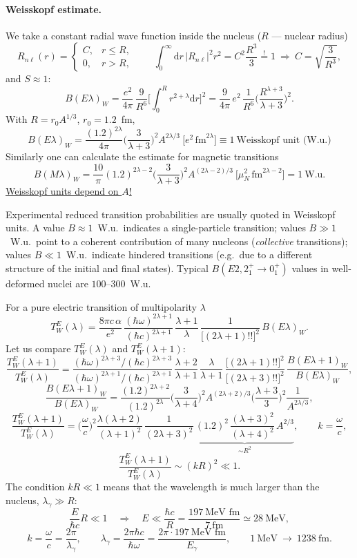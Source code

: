 \documentclass[11pt,a4paper]{article}
\newcommand{\ud}{\mathrm{d}}
\begin{document}
\paragraph{Weisskopf estimate.} We take a constant radial wave function inside the nucleus ($R$ --- nuclear radius)
\[
R_{n\ell}(r)=\begin{cases}C, & r\le R,\\ 0, & r>R,\end{cases}
\qquad
\int_0^\infty\ud r\,|R_{n\ell}|^2r^2=C^2\frac{R^3}{3}\overset{!}{=}1\ \Rightarrow\ C=\sqrt{\frac{3}{R^3}},
\]
and $S\approx1$:
\[
B(E\lambda)_W=\frac{e^2}{4\pi}\,\frac{9}{R^6}\Big[\int_0^Rr^{2+\lambda}\ud r\Big]^2=\frac{9}{4\pi}\,e^2\,\frac{1}{R^6}\Big(\frac{R^{\lambda+3}}{\lambda+3}\Big)^2 .
\]
With $R=r_0A^{1/3}$, $r_0=1.2$~fm,
\[
B(E\lambda)_W=\frac{(1.2)^{2\lambda}}{4\pi}\Big(\frac{3}{\lambda+3}\Big)^2A^{2\lambda/3}\ \big[e^2\,\text{fm}^{2\lambda}\big]\equiv1\ \text{Weisskopf unit (W.u.)}
\]
Similarly one can calculate the estimate for magnetic transitions
\[
B(M\lambda)_W=\frac{10}{\pi}(1.2)^{2\lambda-2}\Big(\frac{3}{\lambda+3}\Big)^2A^{(2\lambda-2)/3}\ \big[\mu_N^2\,\text{fm}^{2\lambda-2}\big]=1\ \text{W.u.}
\]
\underline{Weisskopf units depend on $A$!}

Experimental reduced transition probabilities are usually quoted in Weisskopf units. A value $B\approx1$~W.u.\ indicates a single-particle transition; values $B\gg1$~W.u.\ point to a coherent contribution of many nucleons (\emph{collective} transitions); values $B\ll1$~W.u.\ indicate hindered transitions (e.g.\ due to a different structure of the initial and final states). Typical $B(E2,2^+_1\to0^+_1)$ values in well-deformed nuclei are $100$--$300$~W.u.


For a pure electric transition of multipolarity $\lambda$
\[
T^E_W(\lambda)=\frac{8\pi c\,\alpha}{e^2}\,\frac{(\hbar\omega)^{2\lambda+1}}{(\hbar c)^{2\lambda+1}}\,\frac{\lambda+1}{\lambda}\,\frac{1}{\big[(2\lambda+1)!!\big]^2}\,B(E\lambda)_W .
\]
Let us compare $T^E_W(\lambda)$ and $T^E_W(\lambda+1)$:
\[
\frac{T^E_W(\lambda+1)}{T^E_W(\lambda)}=\frac{(\hbar\omega)^{2\lambda+3}/(\hbar c)^{2\lambda+3}}{(\hbar\omega)^{2\lambda+1}/(\hbar c)^{2\lambda+1}}\,\frac{\lambda+2}{\lambda+1}\,\frac{\lambda}{\lambda+1}\,\frac{\big[(2\lambda+1)!!\big]^2}{\big[(2\lambda+3)!!\big]^2}\,\frac{B(E\lambda{+}1)_W}{B(E\lambda)_W},
\]
\[
\frac{B(E\lambda{+}1)_W}{B(E\lambda)_W}=\frac{(1.2)^{2\lambda+2}}{(1.2)^{2\lambda}}\Big(\frac{3}{\lambda+4}\Big)^2A^{(2\lambda+2)/3}\Big(\frac{\lambda+3}{3}\Big)^2\frac{1}{A^{2\lambda/3}},
\]
\[
\frac{T^E_W(\lambda+1)}{T^E_W(\lambda)}=\Big(\frac\omega c\Big)^2\frac{\lambda(\lambda+2)}{(\lambda+1)^2}\,\frac{1}{(2\lambda+3)^2}\,
\underbrace{(1.2)^2\,\frac{(\lambda+3)^2}{(\lambda+4)^2}\,A^{2/3}}_{\sim R^2},
\qquad k=\frac\omega c ,
\]
\[
\frac{T^E_W(\lambda+1)}{T^E_W(\lambda)}\sim(kR)^2\ll1 .
\]
The condition $kR\ll1$ means that the wavelength is much larger than the nucleus, $\lambda_\gamma\gg R$:
\[
\frac{E}{\hbar c}R\ll1\quad\Rightarrow\quad E\ll\frac{\hbar c}{R}=\frac{197\ \text{MeV fm}}{7\ \text{fm}}\simeq28\ \text{MeV},
\]
\[
k=\frac\omega c=\frac{2\pi}{\lambda_\gamma},\qquad \lambda_\gamma=\frac{2\pi\hbar c}{\hbar\omega}=\frac{2\pi\cdot197\ \text{MeV fm}}{E_\gamma},
\qquad 1\ \text{MeV}\ \to\ 1238\ \text{fm}.
\]
\end{document}
